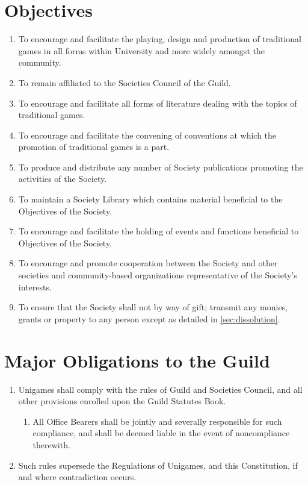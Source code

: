 \documentclass[a4paper]{article}
\begin{document}
\section{Objectives} \label{sec:objectives}
\begin{enumerate}
    \item To encourage and facilitate the playing, design and production of traditional games in all forms within University and more widely amongst the community.
    \item To remain affiliated to the Societies Council of the Guild.
    \item To encourage and facilitate all forms of literature dealing with the topics of traditional games.
    \item To encourage and facilitate the convening of conventions at which the promotion of traditional games is a part.
    \item To produce and distribute any number of Society publications promoting the activities of the Society.
    \item To maintain a Society Library which contains material beneficial to the Objectives of the Society.
    \item To encourage and facilitate the holding of events and functions beneficial to Objectives of the Society.
    \item To encourage and promote cooperation between the Society and other societies and community-based organizations representative of the Society's interests.
    \item To ensure that the Society shall not by way of gift; transmit any monies, grants or property to any person except as detailed in \cref{sec:dissolution}.
\end{enumerate}


\section{Major Obligations to the Guild} \label{sec:obligations}
\begin{enumerate}
    \item Unigames shall comply with the rules of Guild and Societies Council, and all other provisions enrolled upon the Guild Statutes Book.
          \begin{enumerate}
              \item All Office Bearers shall be jointly and severally responsible for such compliance, and shall be deemed liable in the event of noncompliance therewith.
          \end{enumerate}
    \item Such rules supersede the Regulations of Unigames, and this Constitution, if and where contradiction occurs.
\end{enumerate}
\end{document}
